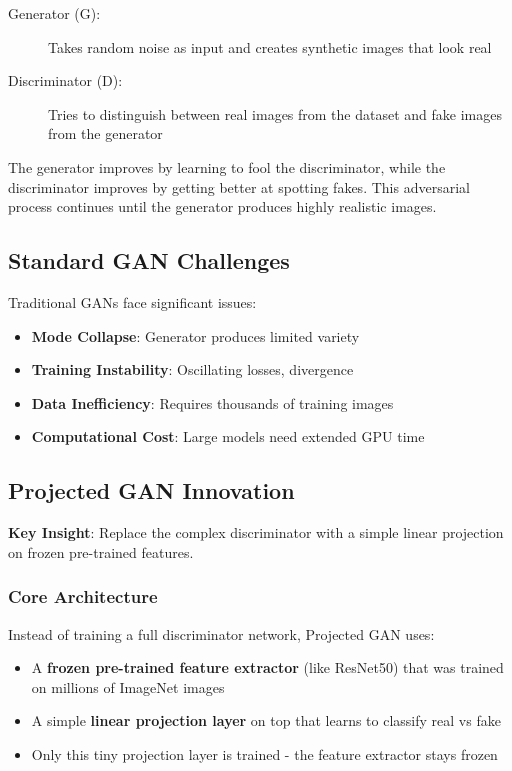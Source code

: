 \documentclass[11pt,a4paper]{article}
\begin{document}
\begin{description}
    \item[Generator (G):] Takes random noise as input and creates synthetic images that look real
    \item[Discriminator (D):] Tries to distinguish between real images from the dataset and fake images from the generator
\end{description}

The generator improves by learning to fool the discriminator, while the discriminator improves by getting better at spotting fakes. This adversarial process continues until the generator produces highly realistic images.

\subsection{Standard GAN Challenges}

Traditional GANs face significant issues:
\begin{itemize}[noitemsep]
    \item \textbf{Mode Collapse}: Generator produces limited variety
    \item \textbf{Training Instability}: Oscillating losses, divergence
    \item \textbf{Data Inefficiency}: Requires thousands of training images
    \item \textbf{Computational Cost}: Large models need extended GPU time
\end{itemize}

\subsection{Projected GAN Innovation}

\textbf{Key Insight}: Replace the complex discriminator with a simple linear projection on frozen pre-trained features.

\subsubsection{Core Architecture}

Instead of training a full discriminator network, Projected GAN uses:
\begin{itemize}[noitemsep]
    \item A \textbf{frozen pre-trained feature extractor} (like ResNet50) that was trained on millions of ImageNet images
    \item A simple \textbf{linear projection layer} on top that learns to classify real vs fake
    \item Only this tiny projection layer is trained - the feature extractor stays frozen
\end{itemize}
\end{document}
